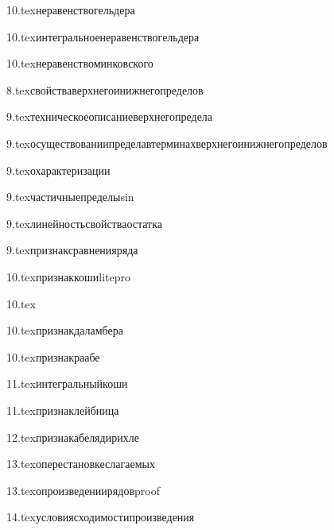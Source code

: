 {10.tex}{неравенствогельдера}

{10.tex}{интегральноенеравенствогельдера}

{10.tex}{неравенствоминковского}

{8.tex}{свойстваверхнегоинижнегопределов}

{9.tex}{техническоеописаниеверхнегопредела}

{9.tex}{осуществованиипределавтерминахверхнегоинижнегопределов}

{9.tex}{охарактеризации}

{9.tex}{частичныепределыsin}

{9.tex}{линейностьсвойстваостатка}

{9.tex}{признаксравненияряда}

{10.tex}{признаккошиlitepro}
\label{признаккошиpro}

{10.tex}{}

{10.tex}{признакдаламбера}

{10.tex}{признакраабе}

{11.tex}{интегральныйкоши}

{11.tex}{признаклейбница}

{12.tex}{признакабелядирихле}

{13.tex}{оперестановкеслагаемых}

{13.tex}{опроизведениирядовproof}

{14.tex}{условиясходимостипроизведения}

